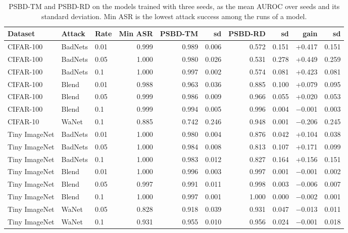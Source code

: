 \begin{table}[htbp]
\centering
\small
\caption{PSBD-TM and PSBD-RD on the models trained with three seeds, as the mean AUROC over seeds and its standard deviation. Min ASR is the lowest attack success among the runs of a model.}
\label{tab:seeds}
\begin{adjustbox}{max width=\linewidth}
\begin{tabular}{lllrrrrrrr}
\toprule
Dataset & Attack & Rate & Min ASR & PSBD-TM & sd & PSBD-RD & sd & gain & sd \\
\midrule
CIFAR-100 & BadNets & 0.01 & 0.999 & 0.989 & 0.006 & 0.572 & 0.151 & +0.417 & 0.151 \\
CIFAR-100 & BadNets & 0.05 & 1.000 & 0.980 & 0.026 & 0.531 & 0.278 & +0.449 & 0.259 \\
CIFAR-100 & BadNets & 0.1 & 1.000 & 0.997 & 0.002 & 0.574 & 0.081 & +0.423 & 0.081 \\
CIFAR-100 & Blend & 0.01 & 0.988 & 0.963 & 0.036 & 0.885 & 0.100 & +0.079 & 0.095 \\
CIFAR-100 & Blend & 0.05 & 0.999 & 0.986 & 0.009 & 0.966 & 0.055 & +0.020 & 0.053 \\
CIFAR-100 & Blend & 0.1 & 0.999 & 0.994 & 0.005 & 0.996 & 0.004 & $-$0.001 & 0.003 \\
CIFAR-10 & WaNet & 0.1 & 0.885 & 0.742 & 0.246 & 0.948 & 0.001 & $-$0.206 & 0.245 \\
Tiny ImageNet & BadNets & 0.01 & 1.000 & 0.980 & 0.004 & 0.876 & 0.042 & +0.104 & 0.038 \\
Tiny ImageNet & BadNets & 0.05 & 1.000 & 0.984 & 0.008 & 0.813 & 0.107 & +0.171 & 0.099 \\
Tiny ImageNet & BadNets & 0.1 & 1.000 & 0.983 & 0.012 & 0.827 & 0.164 & +0.156 & 0.151 \\
Tiny ImageNet & Blend & 0.01 & 1.000 & 0.996 & 0.003 & 0.997 & 0.001 & $-$0.001 & 0.002 \\
Tiny ImageNet & Blend & 0.05 & 0.997 & 0.991 & 0.011 & 0.998 & 0.003 & $-$0.006 & 0.007 \\
Tiny ImageNet & Blend & 0.1 & 1.000 & 0.997 & 0.001 & 1.000 & 0.000 & $-$0.002 & 0.001 \\
Tiny ImageNet & WaNet & 0.05 & 0.828 & 0.918 & 0.039 & 0.931 & 0.047 & $-$0.013 & 0.011 \\
Tiny ImageNet & WaNet & 0.1 & 0.931 & 0.955 & 0.010 & 0.956 & 0.024 & $-$0.001 & 0.018 \\
\bottomrule
\end{tabular}
\end{adjustbox}
\end{table}
